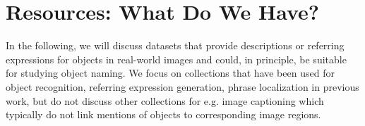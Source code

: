 \documentclass[runningheads]{llncs}
\newcommand{\cs}[1]{\textcolor{PineGreen}{\emph{//cs: #1//}}}
\newcommand{\refexp}[1]{\textsl{#1}}
\begin{document}
%
%


\section{Resources: What Do We Have?}
\label{sec:resources}

In the following, we will discuss datasets that provide descriptions or referring expressions for objects in real-world images and could, in principle,  be suitable for studying object naming. We focus on collections  that have been used for object recognition, referring expression generation, phrase localization in previous work, but do not discuss other collections for e.g. image captioning which typically do not link mentions of objects to corresponding image regions.
\end{document}
